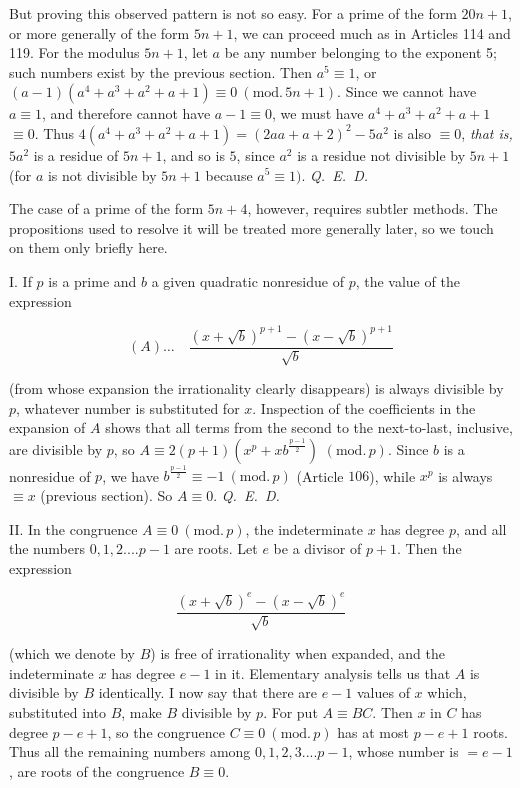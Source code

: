 But proving this observed pattern is not so easy. For a prime of the form $20n+1$, or more generally of the form $5n+1$, we can proceed much as in Articles 114 and 119. For the modulus $5n+1$, let $a$ be any number belonging to the exponent 5; such numbers exist by the previous section. Then $a^5\equiv1$, or $(a-1)(a^4+a^3+a^2+a+1)\equiv0\ (\mathrm{mod.}\,5n+1)$. Since we cannot have $a\equiv1$, and therefore cannot have $a-1\equiv0$, we must have $a^4+a^3+a^2+a+1$ $\equiv0$. Thus $4(a^4+a^3+a^2+a+1)=(2aa+a+2)^2-5a^2$ is also $\equiv0$, \textit{that is,} $5a^2$ is a residue of $5n+1$, and so is $5$, since $a^2$ is a residue not divisible by $5n+1$ (for $a$ is not divisible by $5n+1$ because $a^5\equiv1)$. \mbox{\textit{Q. E. D.}}

The case of a prime of the form $5n+4$, however, requires subtler methods. The propositions used to resolve it will be treated more generally later, so we touch on them only briefly here.

I. If $p$ is a prime and $b$ a given quadratic nonresidue of $p$, the value of the expression

\[
(A)\ldots\quad\frac{(x+\surd b)^{p+1}-(x-\surd b)^{p+1}}{\surd b}
\]

(from whose expansion the irrationality clearly disappears) is always divisible by $p$, whatever number is substituted for $x$. Inspection of the coefficients in the expansion of $A$ shows that all terms from the second to the next-to-last, inclusive, are divisible by $p$, so $A\equiv2(p+1)(x^p+xb^{\frac{p-1}{2}})$ $(\mathrm{mod.}\,p)$. Since $b$ is a nonresidue of $p$, we have $b^{\frac{p-1}{2}}\equiv-1\ (\mathrm{mod.}\,p)$ (Article $106$), while $x^p$ is always $\equiv x$ (previous section). So $A\equiv0$. \mbox{\textit{Q. E. D.}}

II. In the congruence $A\equiv0\ (\mathrm{mod.}\,p)$, the indeterminate $x$ has degree $p$, and all the numbers $0,1,2....p-1$ are roots. Let $e$ be a divisor of $p+1$. Then the expression

\[
\frac{(x+\surd b)^e-(x-\surd b)^e}{\surd b}
\]

(which we denote by $B$) is free of irrationality when expanded, and the indeterminate $x$ has degree $e-1$ in it. Elementary analysis tells us that $A$ is divisible by $B$ identically. I now say that there are $e-1$ values of $x$ which, substituted into $B$, make $B$ divisible by $p$. For put $A\equiv BC$. Then $x$ in $C$ has degree $p-e+1$, so the congruence $C\equiv0\ (\mathrm{mod.}\,p)$ has at most $p-e+1$ roots. Thus all the remaining numbers among $0,1,2,3....p-1$, whose number is $=e-1$, are roots of the congruence $B\equiv0$.

